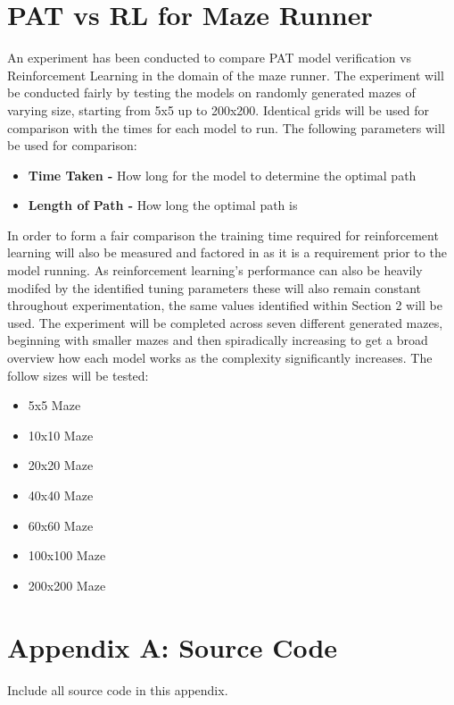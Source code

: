\documentclass[twoside, 12pt, a4paper]{article}
\begin{document}
\section{PAT vs RL for Maze Runner}
An experiment has been conducted to compare PAT model verification vs Reinforcement Learning in the domain of the maze runner. The experiment will be conducted fairly by testing the models on randomly generated mazes of varying size, starting from 5x5 up to 200x200. Identical grids will be used for comparison with the times for each model to run. The following parameters will be used for comparison:
\begin {itemize}
\item \textbf{Time Taken -} How long for the model to determine the optimal path
\item \textbf{Length of Path -} How long the optimal path is
\end {itemize}
In order to form a fair comparison the training time required for reinforcement learning will also be measured and factored in as it is a requirement prior to the model running. As reinforcement learning's performance can also be heavily modifed by the identified tuning parameters these will also remain constant throughout experimentation, the same values identified within Section 2 will be used.  The experiment will be completed across seven different generated mazes, beginning with smaller mazes and then spiradically increasing to get a broad overview how each model works as the complexity significantly increases. The follow sizes will be tested:
\begin {itemize}
\item 5x5 Maze
\item 10x10 Maze
\item 20x20 Maze
\item 40x40 Maze
\item 60x60 Maze
\item 100x100 Maze
\item 200x200 Maze
\end {itemize}





\newpage
\appendix
\section*{Appendix A: Source Code}

Include all source code in this appendix.
\end{document}

